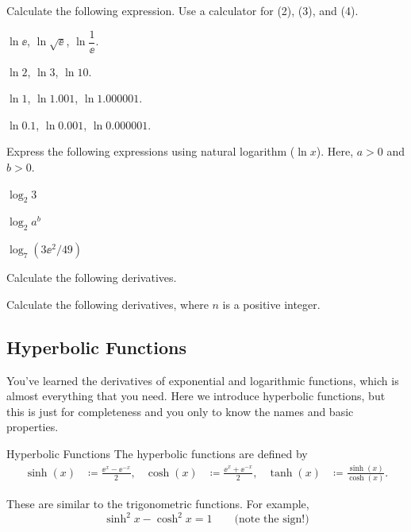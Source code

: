 \documentclass[11pt,pdfa,lastpage]{MishoNote}
\begin{document}
\begin{enumerate}[resume]
 \itemA Calculate the following expression. Use a calculator for (2), (3), and (4).
 \begin{menumerate}{2}
\item $\ln \ee$, $\ln \sqrt{\ee}$, $\ln \dfrac{1}{\ee}$.
\item $\ln 2$, $\ln 3$, $\ln 10$.
\item $\ln 1$, $\ln 1.001$, $\ln 1.000001$.
\item $\ln 0.1$, $\ln 0.001$, $\ln 0.000001$.
 \end{menumerate}
\itemB Express the following expressions using natural logarithm ($\ln x$). Here, $a>0$ and $b>0$.
\begin{menumerate}{3}
  \item $\log_2 3$
  \item $\log_2a^b$
  \item $\log_7(3\ee^2/49)$
\end{menumerate}
  \itemS Calculate the following derivatives.
  \begin{menumerate}{4}
  \end{menumerate}
  \itemB Calculate the following derivatives, where $n$ is a positive integer.
  \begin{menumerate}{3}
\end{menumerate}
\end{enumerate}

\newpage

\subsection{Hyperbolic Functions}
You've learned the derivatives of exponential and logarithmic functions, which is almost everything that you need.
Here we introduce hyperbolic functions, but this is just for completeness and you only to know the names and basic properties.
\begin{definition}{Hyperbolic Functions}{}
  The hyperbolic functions are defined by
  \begin{align}
    \sinh(x) &\coloneq \frac{\ee^x-\ee^{-x}}{2},&
    \cosh(x) &\coloneq \frac{\ee^x+\ee^{-x}}{2},&
    \tanh(x) &\coloneq \frac{\sinh(x)}{\cosh(x)}.
  \end{align}
\end{definition}
These are similar to the trigonometric functions. For example,
\[ \sinh^2x-\cosh^2x=1 \qquad\text{(note the sign!)} \]
\end{document}
